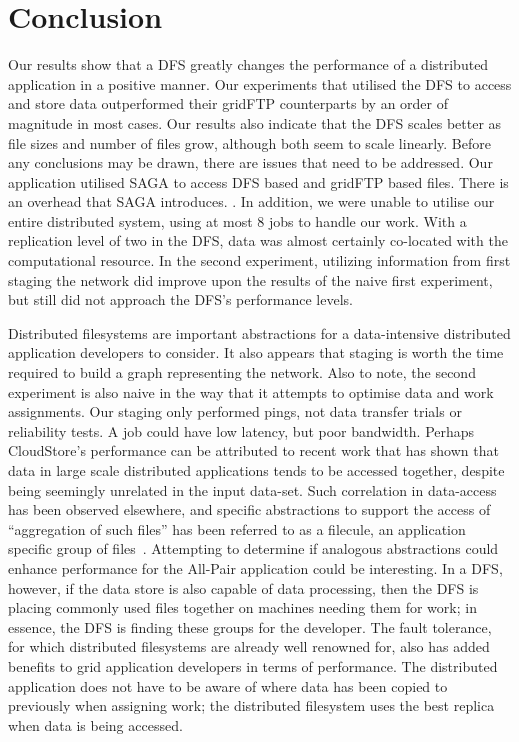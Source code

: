\documentclass{rspublic}
\begin{document}
\section{Conclusion} Our results show that a DFS greatly changes the
performance of a distributed application in a positive manner. Our
experiments that utilised the DFS to access and store data outperformed
their gridFTP counterparts by an order of magnitude in most cases. Our
results also indicate that the DFS scales better as file sizes and
number of files grow, although both seem to scale linearly. Before any
conclusions may be drawn, there are issues that need to be addressed.
Our application utilised SAGA to access DFS based and gridFTP based
files. There is an overhead that SAGA introduces.  .  In addition, we
were unable to utilise our entire distributed system, using at most 8
jobs to handle our work.  With a replication level of two in the DFS,
data was almost certainly co-located with the computational resource. In
the second experiment, utilizing information from first staging the
network did improve upon the results of the naive first experiment, but
still did not approach the DFS's performance levels.

Distributed filesystems are important abstractions for a data-intensive
distributed application developers to consider. It also appears that
staging is worth the time required to build a graph representing the
network. Also to note, the second experiment is also naive in the way
that it attempts to optimise data and work assignments. Our staging
only performed pings, not data transfer trials or reliability tests. A
job could have low latency, but poor bandwidth. Perhaps CloudStore's
performance can be attributed to recent work that has shown that data in
large scale distributed applications tends to be accessed together,
despite being seemingly unrelated in the input data-set. Such
correlation in data-access has been observed elsewhere, and specific
abstractions to support the access of ``aggregation of such files'' has
been referred to as a filecule, an application specific group of
files~\cite{filecule}. Attempting to determine if analogous
abstractions could enhance performance for the All-Pair application
could be interesting. In a DFS, however, if the data store is also
capable of data processing, then the DFS is placing commonly used files
together on machines needing them for work; in essence, the DFS is
finding these groups for the developer. The fault tolerance, for which
distributed filesystems are already well renowned for, also has added
benefits to grid application developers in terms of performance. The
distributed application does not have to be aware of where data has been
copied to previously when assigning work; the distributed filesystem
uses the best replica when data is being accessed.
\end{document}
